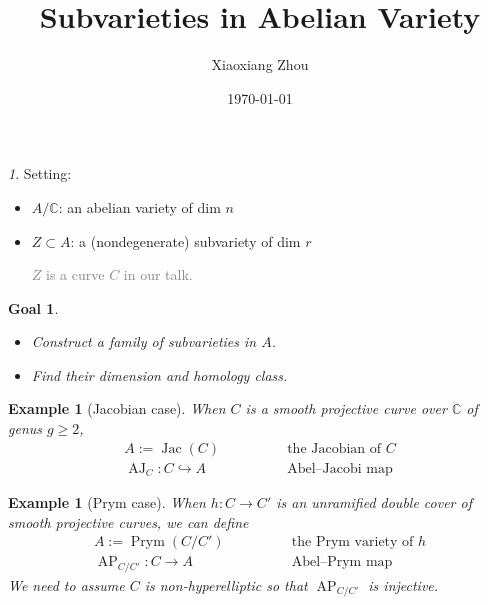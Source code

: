 \documentclass[pdf]{beamer}
\title{Subvarieties in Abelian Variety}
\author{Xiaoxiang Zhou}
\institute[HU berlin]{Humboldt-Universität zu Berlin}
\date{\today}
\numberwithin{equation}{section}
\theoremstyle{plain}
\newtheorem{eg}[theorem]{Example}
\newtheorem{goal}[theorem]{Goal}
\theoremstyle{plain}
\theoremstyle{remark}
\newtheorem{short}{ }
\newcommand*{\ignore}[1]{\textcolor{gray}{#1}}
\DeclareMathOperator{\Jac}{\operatorname{Jac}}
\DeclareMathOperator{\Prym}{\operatorname{Prym}}
\DeclareMathOperator{\AJ}{\operatorname{AJ}}
\DeclareMathOperator{\AP}{\operatorname{AP}}
\begin{document}
\begin{frame}
	\titlepage
\end{frame}
\begin{frame}[fragile]
\begin{short}
Setting:
\begin{itemize}
	\item $A/\mathbb{C}$: an abelian variety of dim $n$
	\item $Z \subset A$: a (nondegenerate) subvariety of dim $r$

\ignore{$Z$ is a curve $C$ in our talk.}
	
\end{itemize}
\end{short}

%	

\begin{goal}
\begin{itemize}
	\item Construct a family of subvarieties in $A$.
	\item Find their dimension and homology class.
	
\end{itemize}
\end{goal}
\end{frame}

\begin{frame}[fragile]
\begin{eg}[Jacobian case]
When $C$ is a smooth projective curve over $\mathbb{C}$ of genus $g \geqslant 2$, 
\begin{equation*}
\begin{aligned}
 A:=\Jac(C) &\qquad\qquad \text{the Jacobian of $C$}  \\ 
 \AJ_C:C \hookrightarrow A &\qquad\qquad \text{Abel--Jacobi map}
\end{aligned}
\end{equation*}
\end{eg}

\begin{eg}[Prym case]
When $h:C \longrightarrow C'$ is an unramified double cover of smooth projective curves, we can define
\begin{equation*}
\begin{aligned}
 A:=\Prym(C/C') &\qquad\qquad \text{the Prym variety of $h$}  \\ 
 \AP_{C/C'}:C \longrightarrow A &\qquad\qquad \text{Abel--Prym map}
\end{aligned}
\end{equation*}
We need to assume $C$ is non-hyperelliptic so that $\AP_{C/C'}$ is injective.
\end{eg}
\end{frame}
\end{document}

